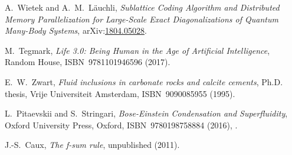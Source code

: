 \documentclass[11pt, a4paper]{report} %
\begin{document}
\begin{thebibliography}{99}
A.~Wietek and A.~M.~Läuchli, \textit{Sublattice Coding Algorithm and Distributed Memory Parallelization for Large-Scale Exact Diagonalizations of Quantum Many-Body Systems}, arXiv:\href{https://arxiv.org/abs/1804.05028}{1804.05028}.




M.~Tegmark, \emph{Life 3.0: Being Human in the Age of Artificial Intelligence}, Random House, ISBN~9781101946596 (2017).



E.~W.~Zwart, \emph{Fluid inclusions in carbonate rocks and calcite cements}, Ph.D. thesis, Vrije Universiteit Amsterdam, ISBN~9090085955 (1995).






L.~Pitaevskii and S.~Stringari, \textit{Bose-Einstein Condensation and Superfluidity}, Oxford University Press, Oxford, ISBN~9780198758884 (2016), .




J.-S.~Caux, \emph{The f-sum rule}, unpublished (2011).





\end{thebibliography}
\end{document}
